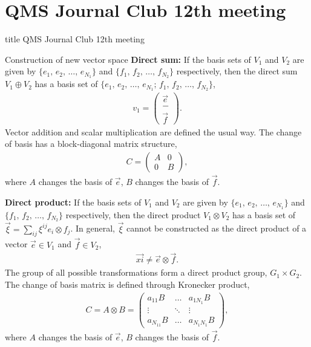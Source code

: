 \documentclass{beamer}
\begin{document}
\section{QMS Journal Club 12th meeting}
\begin{frame}
\vfill
\centering
\begin{beamercolorbox}[sep=8pt,center,shadow=true,rounded=true]{title}
\Large QMS Journal Club 12th meeting
\end{beamercolorbox}
\vfill
\end{frame}

\begin{frame}{Construction of new vector space}
\justify
\textbf{Direct sum:} If the basis sets of $V_1$ and $V_2$ are given by $\{e_1,\, e_2,\, \ldots,\, e_{N_1}\}$ and $\{f_1,\, f_2,\, \ldots,\, f_{N_2}\}$ respectively, then the direct sum $V_1 \oplus V_2$ has a basis set of $\{e_1,\, e_2,\, \ldots,\, e_{N_1};\, f_1,\, f_2,\, \ldots,\, f_{N_2}\}$,
\begin{align}
v_1 = \begin{pmatrix}
\vec{e} \\
- \\
\vec{f}
\end{pmatrix}.
\end{align}
\vfill
Vector addition and scalar multiplication are defined the usual way. The change of basis has a block-diagonal matrix structure,
\begin{align}
C = \begin{pmatrix}
A & 0 \\
0 & B
\end{pmatrix},
\end{align}
where $A$ changes the basis of $\vec{e}$, $B$ changes the basis of $\vec{f}$.
\end{frame}

\begin{frame}
\justify
\textbf{Direct product:} If the basis sets of $V_1$ and $V_2$ are given by $\{e_1,\, e_2,\, \ldots,\, e_{N_1}\}$ and $\{f_1,\, f_2,\, \ldots,\, f_{N_2}\}$ respectively, then the direct product $V_1 \otimes V_2$ has a basis set of $\vec{\xi} = \sum_{ij} \xi^{ij} e_i \otimes f_j$.
\vfill
In general, $\vec{\xi}$ cannot be constructed as the direct product of a vector $\vec{e} \in V_1$ and $\vec{f} \in V_2$,
\begin{align}
\vec{xi} \neq \vec{e} \otimes \vec{f}.
\end{align}
\vfill
The group of all possible transformations form a direct product group, $G_1 \times G_2$.
\vfill
The change of basis matrix is defined through Kronecker product,
\begin{align}
C = A \otimes B = \begin{pmatrix}
a_{11}B & \ldots & a_{1N_1} B \\
\vdots & \ddots & \vdots \\
a_{N_11} B & \ldots & a_{N_1 N_1} B
\end{pmatrix},
\end{align}
where $A$ changes the basis of $\vec{e}$, $B$ changes the basis of $\vec{f}$.
\end{frame}
\end{document}
